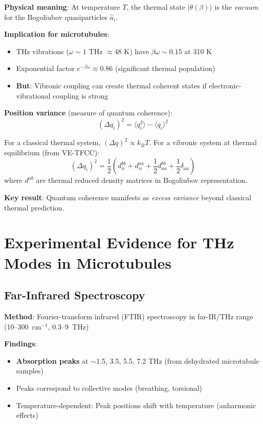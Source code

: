 \textbf{Physical meaning}: At temperature $T$, the thermal state
$|\theta(\beta)\rangle$ is the \emph{vacuum} for the Bogoliubov
quasiparticles $\hat{a}_i$.

\textbf{Implication for microtubules}:
\begin{itemize}
\item THz vibrations ($\omega \sim 1$ THz $\approx 48$ K) have $\beta \omega \sim 0.15$ at 310 K
\item Exponential factor $e^{-\beta \omega} \approx 0.86$ (significant thermal population)
\item \textbf{But}: Vibronic coupling can create thermal coherent states if electronic-vibrational coupling is strong
\end{itemize}

\textbf{Position variance} (measure of quantum coherence):
\begin{equation}
\label{eq:position-variance}
(\Delta q_i)^2 = \langle q_i^2 \rangle - \langle q_i \rangle^2
\end{equation}

For a classical thermal system, $(\Delta q)^2 \propto k_B T$. For a vibronic system at thermal equilibrium (from VE-TFCC):
\[(\Delta q_i)^2 = \frac{1}{2} \left( d_{ii}^{bb} + d_{ii}^{aa} + \frac{1}{2} d_{aa}^{bb} + \frac{1}{2} \delta_{aa} \right)\]
where $d^{ab}$ are thermal reduced density matrices in Bogoliubov representation.

\textbf{Key result}: Quantum coherence manifests as \emph{excess variance} beyond classical thermal prediction.



\section{Experimental Evidence for THz Modes in Microtubules}\label{experimental-evidence-for-thz-modes-in-microtubules}

\subsection{Far-Infrared Spectroscopy}\label{far-infrared-spectroscopy-established}

\textbf{Method}: Fourier-transform infrared (FTIR) spectroscopy in far-IR/THz range (10--300~cm$^{-1}$, 0.3--9~THz)

\textbf{Findings}:
\begin{itemize}
\item \textbf{Absorption peaks} at $\sim$1.5, 3.5, 5.5, 7.2 THz (from dehydrated microtubule samples)
\item Peaks correspond to collective modes (breathing, torsional)
\item Temperature-dependent: Peak positions shift with temperature (anharmonic effects)
\end{itemize}

